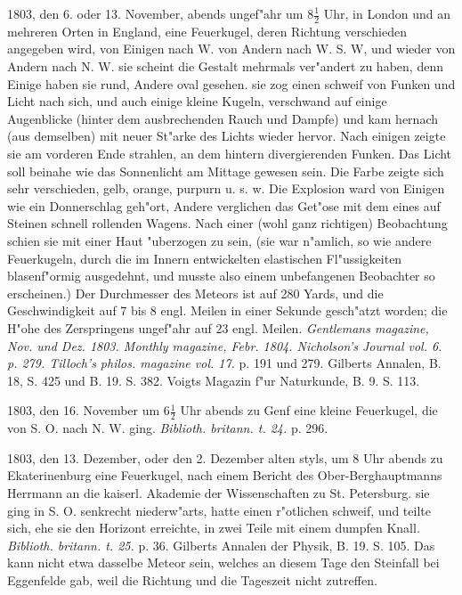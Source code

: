 \documentclass[a4paper, 11pt, oneside, polutonikogreek, german]{article}
\begin{document}
1803, den 6. oder 13. November, abends ungef"ahr um $\mathfrak{8\frac{1}{2}}$ Uhr, in London und an mehreren Orten in England, eine Feuerkugel, deren Richtung verschieden angegeben wird, von Einigen nach W. von Andern nach W. S. W, und wieder von Andern nach N. W. sie scheint die Gestalt mehrmals ver"andert zu haben, denn Einige haben sie rund, Andere oval gesehen. sie zog einen schweif von Funken und Licht nach sich, und auch einige kleine Kugeln, verschwand auf einige Augenblicke (hinter dem ausbrechenden Rauch und Dampfe) und kam hernach (aus demselben) mit neuer St"arke des Lichts wieder hervor. Nach einigen zeigte sie am vorderen Ende strahlen, an dem hintern divergierenden Funken. Das Licht soll beinahe wie das Sonnenlicht am Mittage gewesen sein. Die Farbe zeigte sich sehr verschieden, gelb, orange, purpurn u. s. w. Die Explosion ward von Einigen wie ein Donnerschlag geh"ort, Andere verglichen das Get"ose mit dem eines auf Steinen schnell rollenden Wagens. Nach einer (wohl ganz richtigen) Beobachtung schien sie mit einer Haut "uberzogen zu sein, (sie war n"amlich, so wie andere Feuerkugeln, durch die im Innern entwickelten elastischen Fl"ussigkeiten blasenf"ormig ausgedehnt, und musste also einem unbefangenen Beobachter so erscheinen.) Der Durchmesser des Meteors ist auf 280 Yards, und die Geschwindigkeit auf 7 bis 8 engl. Meilen in einer Sekunde gesch"atzt worden; die H"ohe des Zerspringens ungef"ahr auf 23 engl. Meilen. \emph{Gentlemans magazine, Nov. und Dez. 1803. Monthly magazine, Febr. 1804. Nicholson's Journal vol. 6. p. 279. Tilloch's philos. magazine vol. 17.} p. 191 und 279. Gilberts Annalen, B. 18, S. 425 und B. 19. S. 382. Voigts Magazin f"ur Naturkunde, B. 9. S. 113.

1803, den 16. November um $\mathfrak{6\frac{1}{2}}$ Uhr abends zu Genf eine kleine Feuerkugel, die von S. O. nach N. W. ging. \emph{Biblioth. britann. t. 24.} p. 296.

1803, den 13. Dezember, oder den 2. Dezember alten styls, um 8 Uhr abends zu Ekaterinenburg eine Feuerkugel, nach einem Bericht des Ober-Berghauptmanns Herrmann an die kaiserl. Akademie der Wissenschaften zu St. Petersburg. sie ging in S. O. senkrecht niederw"arts, hatte einen r"otlichen schweif, und teilte sich, ehe sie den Horizont erreichte, in zwei Teile mit einem dumpfen Knall. \emph{Biblioth. britann. t. 25.} p. 36. Gilberts Annalen der Physik, B. 19. S. 105. Das kann nicht etwa dasselbe Meteor sein, welches an diesem Tage den Steinfall bei Eggenfelde gab, weil die Richtung und die Tageszeit nicht zutreffen.
\end{document}
